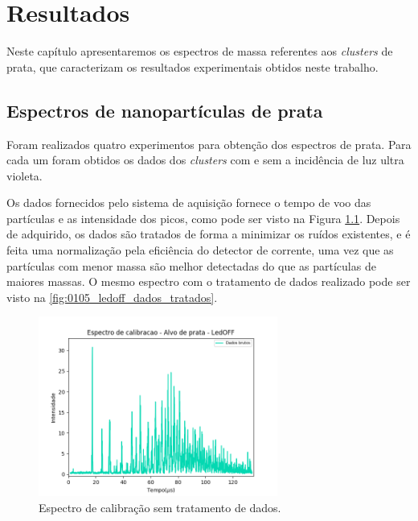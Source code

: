 \chapter{Resultados}
\label{resultados}

Neste capítulo apresentaremos os espectros de massa referentes aos \textit{clusters} de prata, que caracterizam os resultados experimentais obtidos neste trabalho.

\section{Espectros de nanopartículas de prata}
\label{sec:producao_cluster}
Foram realizados quatro experimentos para obtenção dos espectros de prata. Para cada um foram obtidos os dados dos \textit{clusters} com e sem a incidência de luz ultra violeta. 

Os dados fornecidos pelo sistema de aquisição
fornece o tempo de voo das partículas e as intensidade dos picos, como pode ser visto na Figura \ref{fig:ex_dados_brutos}. Depois de adquirido, os dados são tratados de forma a minimizar os ruídos existentes, e é feita uma normalização pela eficiência do detector de corrente, uma vez que as partículas com menor massa são melhor detectadas do que as partículas de maiores massas. O mesmo espectro com o tratamento de dados realizado pode ser visto na \ref{fig:0105_ledoff_dados_tratados}.




\begin{figure}
  \centering  
  \includegraphics[width=0.7\textwidth]{exp_01/LedOFF_sem_tratamento.png}
  \caption{Espectro de calibração sem tratamento de dados.}
  \label{fig:ex_dados_brutos} 
\end{figure}

